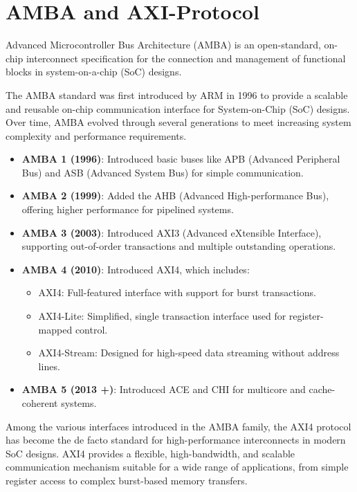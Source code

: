 \section{AMBA and AXI-Protocol}

Advanced Microcontroller Bus Architecture (AMBA) is an open-standard, on-chip interconnect specification for the connection and management of functional blocks in system-on-a-chip (SoC) designs. 

The AMBA standard was first introduced by ARM in 1996 to provide a scalable and reusable on-chip communication interface for System-on-Chip (SoC) designs. Over time, AMBA evolved through several generations to meet increasing system complexity and performance requirements.\cite{walshe_what_2014}

\begin{itemize}
    \item \textbf{AMBA 1 (1996)}: Introduced basic buses like APB (Advanced Peripheral Bus) and ASB (Advanced System Bus) for simple communication.
    \item \textbf{AMBA 2 (1999)}: Added the AHB (Advanced High-performance Bus), offering higher performance for pipelined systems.
    \item \textbf{AMBA 3 (2003)}: Introduced AXI3 (Advanced eXtensible Interface), supporting out-of-order transactions and multiple outstanding operations.
    \item \textbf{AMBA 4 (2010)}: Introduced AXI4, which includes:
        \begin{itemize}
            \item AXI4: Full-featured interface with support for burst transactions.
            \item AXI4-Lite: Simplified, single transaction interface used for register-mapped control.
            \item AXI4-Stream: Designed for high-speed data streaming without address lines.
        \end{itemize}
    \item \textbf{AMBA 5 (2013 +)}: Introduced \ac{ACE} and \ac{CHI} for multicore and cache-coherent systems.
\end{itemize}

Among the various interfaces introduced in the AMBA family, the \ac{AXI4} protocol has become the de facto standard for high-performance interconnects in modern SoC designs. AXI4 provides a flexible, high-bandwidth, and scalable communication mechanism suitable for a wide range of applications, from simple register access to complex burst-based memory transfers.\cite{aldec_inc_xilinx_2025}


